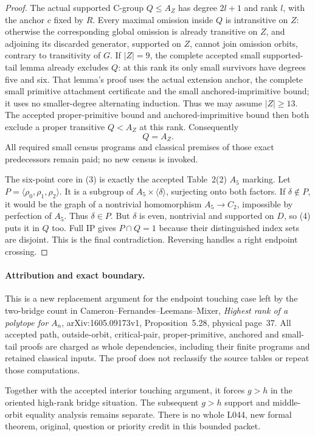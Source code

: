 \documentclass[11pt,a4paper]{article}
\newcommand{\gen}[1]{\langle#1\rangle}
\begin{document}
\begin{proof}
The actual supported C-group $Q\leq A_Z$ has degree $2l+1$
and rank $l$, with the anchor $c$ fixed by $R$. Every maximal
omission inside $Q$ is intransitive on $Z$: otherwise the
corresponding global omission is already transitive on $Z$,
and adjoining its discarded generator, supported on $Z$, cannot
join omission orbits, contrary to transitivity of $G$.
If $|Z|=9$, the complete accepted small supported-tail lemma
already excludes $Q$: at this rank its only small survivors
have degrees five and six. That lemma's proof uses the actual
extension anchor, the complete small primitive attachment
certificate and the small anchored-imprimitive bound; it uses
no smaller-degree alternating induction. Thus we may assume
$|Z|\geq13$. The accepted proper-primitive bound and
anchored-imprimitive bound then both exclude a proper transitive
$Q<A_Z$ at this rank. Consequently
\[
                              Q=A_Z.                    \tag{4}
\]
All required small census programs and classical premises of
those exact predecessors remain paid; no new census is invoked.

The six-point core in (3) is exactly the accepted Table~2(2)
$A_5$ marking. Let $P=\gen{\rho_0,\rho_1,\rho_2}$.
It is a subgroup of $A_5\times\gen\delta$, surjecting onto
both factors. If $\delta\notin P$, it would be the graph of
a nontrivial homomorphism $A_5\to C_2$, impossible by
perfection of $A_5$. Thus $\delta\in P$.
But $\delta$ is even, nontrivial and supported on $D$, so
(4) puts it in $Q$ too. Full IP gives $P\cap Q=1$ because
their distinguished index sets are disjoint. This is the final
contradiction. Reversing handles a right endpoint crossing.
\end{proof}

\paragraph{Attribution and exact boundary.}
This is a new replacement argument for the endpoint touching
case left by the two-bridge count in Cameron--Fernandes--Leemans--Mixer,
\emph{Highest rank of a polytope for $A_n$}, arXiv:1605.09173v1,
Proposition~5.28, physical page~37. All accepted path, outside-orbit,
critical-pair, proper-primitive, anchored and small-tail proofs
are charged as whole dependencies, including their finite
programs and retained classical inputs. The proof does not
reclassify the source tables or repeat those computations.

Together with the accepted interior touching argument, it forces
$g>h$ in the oriented high-rank bridge situation. The subsequent
$g>h$ support and middle-orbit equality analysis remains separate.
There is no whole L044, new formal theorem, original, question
or priority credit in this bounded packet.
\end{document}

